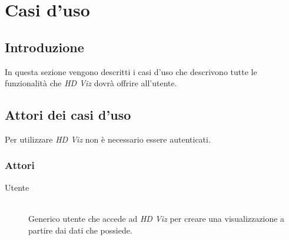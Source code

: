 \section{Casi d'uso}
    \subsection{Introduzione}
    In questa sezione vengono descritti i casi d'uso che descrivono tutte le funzionalità che \emph{HD Viz} dovrà offrire all'utente.
    \subsection{Attori dei casi d'uso}
    Per utilizzare \emph{HD Viz} non è necessario essere autenticati.
    \subsubsection{Attori}
    \begin{description}
        \item[Utente] \hfill \\Generico utente che accede ad \emph{HD Viz} per creare una visualizzazione a partire dai dati che possiede.
    \end{description}
    
    \pagebreak
    
    \pagebreak
    
    \pagebreak
    
    \pagebreak
    
    \pagebreak
    
    \pagebreak
    
    \pagebreak
    